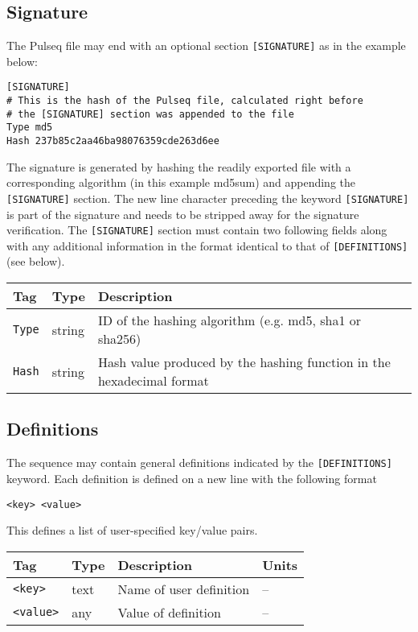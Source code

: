 \documentclass{article}
\begin{document}
\subsection{Signature}

The Pulseq file may end with an optional section \verb.[SIGNATURE]. as in the example below:

\begin{lstlisting}[escapechar=\%]
[SIGNATURE]
# This is the hash of the Pulseq file, calculated right before 
# the [SIGNATURE] section was appended to the file
Type md5
Hash 237b85c2aa46ba98076359cde263d6ee
\end{lstlisting}

The signature is generated by hashing the readily exported file with a corresponding algorithm (in this example md5sum) and appending the \verb.[SIGNATURE]. section. The new line character preceding the keyword \verb.[SIGNATURE]. is part of the signature and needs to be stripped away for the signature verification. The \verb.[SIGNATURE]. section must contain two following fields along with any additional information in the format identical to that of \verb.[DEFINITIONS]. (see below). 

\begin{tabularx}{\textwidth}{llX}
\toprule
Tag & Type & Description\\
\midrule
\verb.Type. & string & ID of the hashing algorithm (e.g. md5, sha1 or sha256) \\
\verb.Hash. & string & Hash value produced by the hashing function in the hexadecimal format \\
\bottomrule
\end{tabularx}

\subsection{Definitions}

The sequence may contain general definitions indicated by the \verb.[DEFINITIONS]. keyword. Each definition is defined on a new line with the following format
\begin{lstlisting}
<key> <value>
\end{lstlisting}
This defines a list of user-specified key/value pairs.

\begin{tabularx}{\textwidth}{llXl}
\toprule
Tag & Type & Description & Units\\
\midrule
\verb.<key>. & text & Name of user definition & -- \\
\verb.<value>. & any & Value of definition & -- \\
\bottomrule
\end{tabularx}
\end{document}

